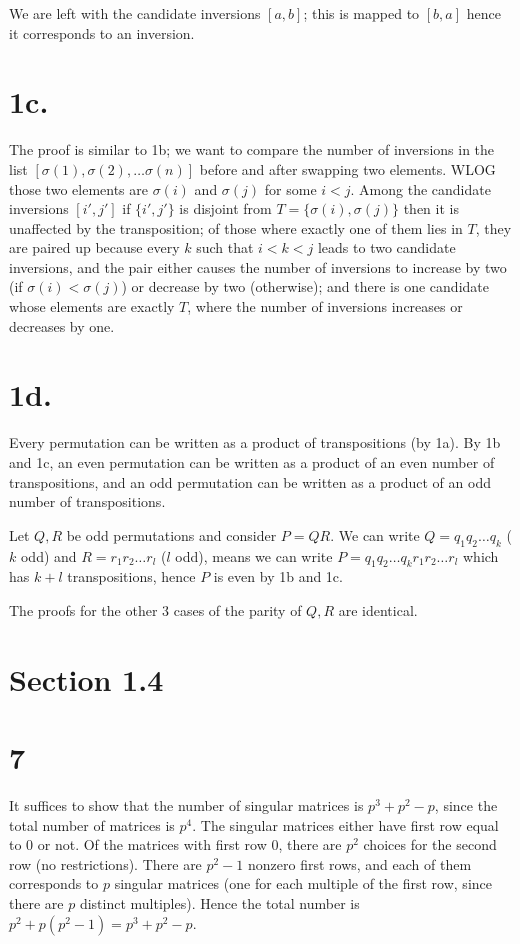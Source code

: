 \documentclass{article}
\begin{document}
We are left with the candidate inversions $[a, b]$; this is mapped to $[b, a]$ hence it corresponds to an inversion.

\section*{1c.}

The proof is similar to 1b; we want to compare the number of inversions in the list $[\sigma(1), \sigma(2), \ldots \sigma(n)]$ before and after swapping two elements. WLOG those two elements are $\sigma(i)$ and $\sigma(j)$ for some $i < j$. Among the candidate inversions $[i', j']$ if $\{i', j'\}$ is disjoint from $T = \{\sigma(i), \sigma(j)\}$ then it is unaffected by the transposition; of those where exactly one of them lies in $T$, they are paired up because every $k$ such that $i < k < j$ leads to two candidate inversions, and the pair either causes the number of inversions to increase by two (if $\sigma(i) < \sigma(j)$) or decrease by two (otherwise); and there is one candidate whose elements are exactly $T$, where the number of inversions increases or decreases by one.

\section*{1d.}

Every permutation can be written as a product of transpositions (by 1a). By 1b and 1c, an even permutation can be written as a product of an even number of transpositions, and an odd permutation can be written as a product of an odd number of transpositions.

Let $Q, R$ be odd permutations and consider $P = QR$. We can write $Q = q_1q_2 \ldots q_k$ ($k$ odd) and $R = r_1r_2 \ldots r_l$ ($l$ odd), means we can write $P = q_1q_2 \ldots q_kr_1r_2 \ldots r_l$ which has $k + l$ transpositions, hence $P$ is even by 1b and 1c.

The proofs for the other 3 cases of the parity of $Q, R$ are identical.

\section*{Section 1.4}

\section*{7}

It suffices to show that the number of singular matrices is $p^3 + p^2 - p$, since the total number of matrices is $p^4$. The singular matrices either have first row equal to 0 or not. Of the matrices with first row 0, there are $p^2$ choices for the second row (no restrictions). There are $p^2 - 1$ nonzero first rows, and each of them corresponds to $p$ singular matrices (one for each multiple of the first row, since there are $p$ distinct multiples). Hence the total number is $p^2 + p(p^2 - 1) = p^3 + p^2 - p$.
\end{document}
